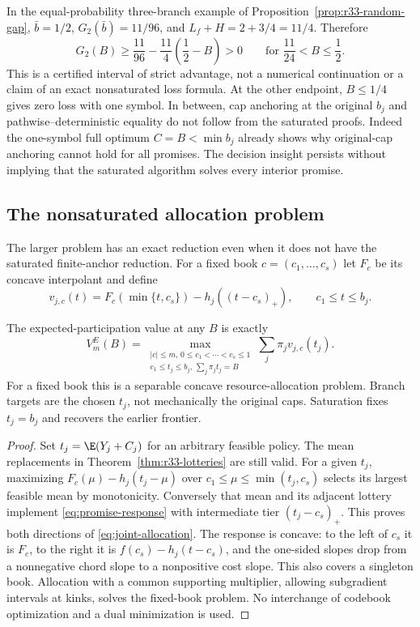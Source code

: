 In the equal-probability three-branch example of Proposition~\ref{prop:r33-random-gap}, $\bar b=1/2$, $G_2(\bar b)=11/96$, and $L_f+H=2+3/4=11/4$. Therefore
\begin{equation}\label{eq:robust-interval}
 G_2(B)\geq\frac{11}{96}-\frac{11}{4}\left(\frac12-B\right)>0
 \qquad\text{for }\frac{11}{24}<B\leq\frac12.
\end{equation}
This is a certified interval of strict advantage, not a numerical continuation or a claim of an exact nonsaturated loss formula. At the other endpoint, $B\leq1/4$ gives zero loss with one symbol. In between, cap anchoring at the original $b_j$ and pathwise--deterministic equality do not follow from the saturated proofs. Indeed the one-symbol full optimum $C=B<\min b_j$ already shows why original-cap anchoring cannot hold for all promises. The decision insight persists without implying that the saturated algorithm solves every interior promise.

\subsection{The nonsaturated allocation problem}
The larger problem has an exact reduction even when it does not have the saturated finite-anchor reduction. For a fixed book $c=(c_1,\ldots,c_s)$ let $F_c$ be its concave interpolant and define
\begin{equation}\label{eq:promise-response}
 v_{j,c}(t)=F_c(\min\{t,c_s\})-h_j((t-c_s)_+),\qquad c_1\leq t\leq b_j.
\end{equation}
\begin{proposition}\label{prop:allocation}
The expected-participation value at any $B$ is exactly
\begin{equation}\label{eq:joint-allocation}
 V_m^E(B)=\max_{\substack{|c|\leq m,\,0\leq c_1<\cdots<c_s\leq1\\
 c_1\leq t_j\leq b_j,\,\sum_j\pi_jt_j=B}}
 \sum_j\pi_j v_{j,c}(t_j).
\end{equation}
For a fixed book this is a separable concave resource-allocation problem. Branch targets are the chosen $t_j$, not mechanically the original caps. Saturation fixes $t_j=b_j$ and recovers the earlier frontier.
\end{proposition}
\begin{proof}
Set $t_j=\E(Y_j+C_j)$ for an arbitrary feasible policy. The mean replacements in Theorem~\ref{thm:r33-lotteries} are still valid. For a given $t_j$, maximizing $F_c(\mu)-h_j(t_j-\mu)$ over $c_1\leq\mu\leq\min(t_j,c_s)$ selects its largest feasible mean by monotonicity. Conversely that mean and its adjacent lottery implement \eqref{eq:promise-response} with intermediate tier $(t_j-c_s)_+$. This proves both directions of \eqref{eq:joint-allocation}. The response is concave: to the left of $c_s$ it is $F_c$, to the right it is $f(c_s)-h_j(t-c_s)$, and the one-sided slopes drop from a nonnegative chord slope to a nonpositive cost slope. This also covers a singleton book. Allocation with a common supporting multiplier, allowing subgradient intervals at kinks, solves the fixed-book problem. No interchange of codebook optimization and a dual minimization is used.
\end{proof}
